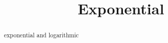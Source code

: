 \documentclass{ximera}
\title{Exponential}
\begin{document}
\begin{abstract}
exponential and logarithmic
\end{abstract}
\maketitle
\end{document}
